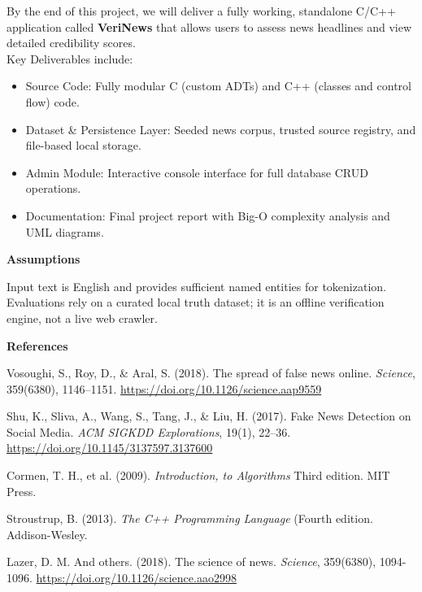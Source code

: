 \documentclass[10pt,a4paper]{article}
\newcommand{\blueheading}[1]{%
    \vspace{2.5mm}%
    {\bfseries\color{TitleBlue}\fontsize{11}{13}\selectfont #1}\par
}
\begin{document}
\begin{dynamicanswerbox}
By the end of this project, we will deliver a fully working, standalone C/C++ application called \textbf{VeriNews} that allows users to assess news headlines and view detailed credibility scores.\\ Key Deliverables include:
\begin{itemize}[leftmargin=4.5mm,itemsep=1pt,topsep=1pt,partopsep=0pt,parsep=0pt]
    \item Source Code: Fully modular C (custom ADTs) and C++ (classes and control flow) code.
    \item Dataset \& Persistence Layer: Seeded news corpus, trusted source registry, and file-based local storage.
    \item Admin Module: Interactive console interface for full database CRUD operations.
    \item Documentation: Final project report with Big-O complexity analysis and UML diagrams.
\end{itemize}
\end{dynamicanswerbox}
\vspace{7mm}
\blueheading{Assumptions}

\begin{dynamicanswerbox}
Input text is English and provides sufficient named entities for tokenization.
Evaluations rely on a curated local truth dataset; it is an offline verification engine, not a live web crawler.
\end{dynamicanswerbox}
\vspace{7mm}
\blueheading{References}

\begin{dynamicanswerbox}
\begin{enumerate}[leftmargin=5mm,label={[\arabic*]},itemsep=0.5pt,topsep=0.5pt,partopsep=0pt,parsep=0pt]
    \item Vosoughi, S., Roy, D., \& Aral, S. (2018). The spread of false news online. \textit{Science}, 359(6380), 1146--1151. \url{https://doi.org/10.1126/science.aap9559}
    \item Shu, K., Sliva, A., Wang, S., Tang, J., \& Liu, H. (2017). Fake News Detection on Social Media. \textit{ACM SIGKDD Explorations}, 19(1), 22--36. \url{https://doi.org/10.1145/3137597.3137600}
    \item Cormen, T. H., et al. (2009). \textit{Introduction, to Algorithms} Third edition. MIT Press.
    \item Stroustrup, B. (2013). \textit{The C++ Programming Language} (Fourth edition. Addison-Wesley.
    \item Lazer, D. M. And others. (2018). The science of news.  \textit{Science}, 359(6380), 1094-1096. \url{https://doi.org/10.1126/science.aao2998}
\end{enumerate}
\end{dynamicanswerbox}
\end{document}
